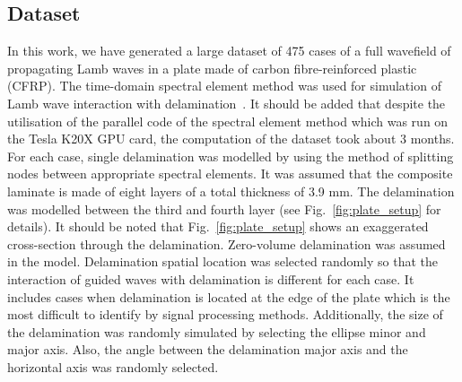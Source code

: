 \subsection{Dataset}
In this work, we have generated a large dataset of 475 cases of a full wavefield of propagating Lamb waves in a plate made of carbon fibre-reinforced plastic (CFRP).
The \DIFaddbegin {}\DIFaddend time-domain spectral element method was used for simulation of Lamb wave interaction with delamination~\cite{Kudela2020}.
It should be added that despite the utilisation of the parallel code of the spectral element method which was run on the Tesla K20X GPU card, the computation of the dataset \DIFaddbegin {}\DIFaddend took about 3 months.
For each case, single delamination was modelled by using the method of splitting nodes between appropriate spectral elements. 
It was assumed that the composite laminate is made of eight layers of a total thickness of 3.9 mm.
The delamination was modelled between the third and fourth layer (see Fig.~\ref{fig:plate_setup} for details).
It should be noted that Fig.~\ref{fig:plate_setup} shows an exaggerated cross-section through the delamination. 
Zero-volume delamination was assumed in the model. 
Delamination spatial location was selected randomly so that the interaction of guided waves with delamination is different for each case.
It includes cases when delamination is located at the edge of the plate which is the most difficult to identify by signal processing methods.
Additionally, the size of the delamination \DIFaddbegin {}\DIFaddend was randomly simulated by selecting the \DIFaddbegin {}\DIFaddend ellipse minor and major axis\DIFdelbegin {}\DIFdelend .
Also, the angle between the delamination major axis and the horizontal axis was randomly selected.
\DIFdelbegin %

